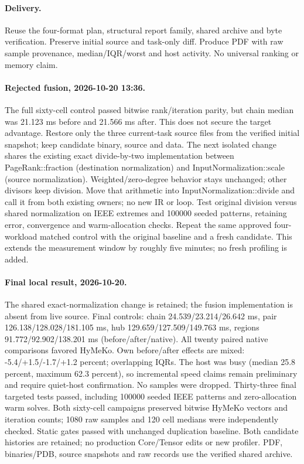 \documentclass[11pt,a4paper]{article}
\begin{document}
\paragraph{Delivery.} Reuse the four-format plan, structural report family, shared archive
and byte verification. Preserve initial source and task-only diff. Produce PDF with raw
sample provenance, median/IQR/worst and host activity. No universal ranking or memory claim.

\paragraph{Rejected fusion, 2026-10-20 13:36.} The full sixty-cell control passed
bitwise rank/iteration parity, but chain median was 21.123 ms before and 21.566 ms
after. This does not secure the target advantage. Restore only the three current-task
source files from the verified initial snapshot; keep candidate binary, source and data.
The next isolated change shares the existing exact divide-by-two implementation between
PageRank::fraction (destination normalization) and InputNormalization::scale (source
normalization). Weighted/zero-degree behavior stays unchanged; other divisors keep division.
Move that arithmetic into InputNormalization::divide and call it from both existing owners;
no new IR or loop. Test original division versus shared normalization on IEEE extremes and
100000 seeded patterns, retaining error, convergence and warm-allocation checks. Repeat the
same approved four-workload matched control with the original baseline and a fresh candidate.
This extends the measurement window by roughly five minutes; no fresh profiling is added.

\paragraph{Final local result, 2026-10-20.} The shared exact-normalization change is
retained; the fusion implementation is absent from live source. Final controls:
chain 24.539/23.214/26.642 ms, pair 126.138/128.028/181.105 ms,
hub 129.659/127.509/149.763 ms, regions 91.772/92.902/138.201 ms
(before/after/native). All twenty paired native comparisons favored HyMeKo.
Own before/after effects are mixed: -5.4/+1.5/-1.7/+1.2 percent; overlapping IQRs.
The host was busy (median 25.8 percent, maximum 62.3 percent), so incremental
speed claims remain preliminary and require quiet-host confirmation. No samples
were dropped. Thirty-three final targeted tests passed, including 100000 seeded
IEEE patterns and zero-allocation warm solves. Both sixty-cell campaigns preserved
bitwise HyMeKo vectors and iteration counts; 1080 raw samples and 120 cell medians
were independently checked. Static gates passed with unchanged duplication baseline.
Both candidate histories are retained; no production Core/Tensor edits or new profiler.
PDF, binaries/PDB, source snapshots and raw records use the verified shared archive.
\end{document}
